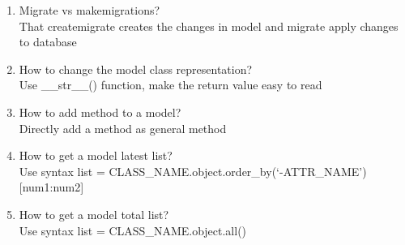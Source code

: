 \documentclass[10pt,a4paper,oneside]{article}
\begin{document}
\begin{enumerate}[1.]
\item Migrate vs makemigrations?\\
That createmigrate creates the changes in model and migrate apply changes to database
\item How to change the model class representation?\\
Use \_\_str\_\_() function, make the return value easy to read
\item How to add method to a model?\\
Directly add a method as general method
\item How to get a model latest list?\\
Use syntax list = CLASS\_NAME.object.order\_by(`-ATTR\_NAME')[num1:num2]
\item How to get a model total list?\\
Use syntax list = CLASS\_NAME.object.all()
\end{enumerate}
\end{document}
